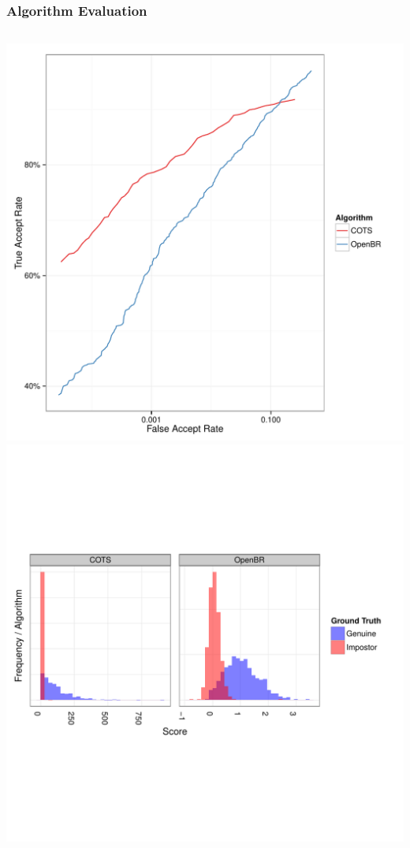 \documentclass[12pt]{beamer}
\begin{document}
\begin{frame}
\frametitle{Algorithm Evaluation}
\begin{columns}
    \includegraphics[width=\textwidth]{img/MEDS/MEDS_ROC}
    \includegraphics[width=\textwidth]{img/MEDS/MEDS_SD}

\end{columns}
\end{frame}
\end{document}
